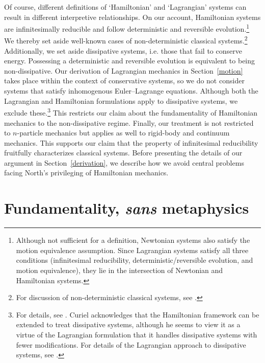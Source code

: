 \documentclass[12pt, english, twoside]{article} %
\begin{document}
Of course, different definitions of `Hamiltonian' and `Lagrangian' systems can result in different interpretive relationships. On our account, Hamiltonian systems are infinitesimally reducible and follow deterministic and reversible evolution.\footnote{Although not sufficient for a definition, Newtonian systems also satisfy the motion equivalence assumption. Since Lagrangian systems satisfy all three conditions (infinitesimal reducibility, deterministic/reversible evolution, and motion equivalence), they lie in the intersection of Newtonian and Hamiltonian systems.} We thereby set aside well-known cases of non-deterministic classical systems.\footnote{For discussion of non-deterministic classical systems, see \textcites*[3-4]{Baez}{Earman}{Norton}.} Additionally, we set aside dissipative systems, i.e. those that fail to conserve energy. Possessing a deterministic and reversible evolution is equivalent to being non-dissipative. Our derivation of Lagrangian mechanics in Section~\ref{motion} takes place within the context of conservative systems, so we do not consider systems that satisfy inhomogenous Euler--Lagrange equations. Although both the Lagrangian and Hamiltonian formulations apply to dissipative systems, we exclude these.\footnote{For details, see \textcites[\S 10.4]{Cline}. Curiel \parencites*[311]{Curiel} acknowledges that the Hamiltonian framework can be extended to treat dissipative systems, although he seems to view it as a virtue of the Lagrangian formulation that it handles dissipative systems with fewer modifications. For details of the Lagrangian approach to dissipative systems, see \textcites[]{Smith}.} This restricts our claim about the fundamentality of Hamiltonian mechanics to the non-dissipative regime. Finally, our treatment is not restricted to $n$-particle mechanics but applies as well to rigid-body and continuum mechanics. This supports our claim that the property of infinitesimal reducibility fruitfully characterizes classical systems. Before presenting the details of our argument in Section~\ref{derivation}, we describe how we avoid central problems facing North's privileging of Hamiltonian mechanics. 


\section{Fundamentality, \textit{sans} metaphysics}
\label{fundamentality}
\end{document}
